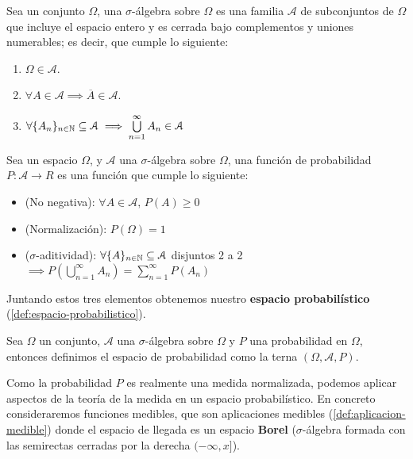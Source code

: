 \begin{definicion}
  Sea un conjunto $\Omega$, una $\sigma$-álgebra sobre $\Omega$ es una familia $\mathcal{A}$ de subconjuntos de $\Omega$ que incluye el espacio entero y es cerrada bajo complementos y uniones numerables; es decir, que cumple lo siguiente:
  \begin{enumerate}
    \item $\Omega \in \mathcal{A}$.
    \item $\forall A \in \mathcal{A} \implies \overline{A} \in \mathcal{A}$.
    \item $\forall \{A_n\}_{n \in \mathbb{N}} \subseteq \mathcal{A} \implies \bigcup \limits^\infty_{n = 1} A_n \in \mathcal{A}$
  \end{enumerate}
  \label{def:sigma-algebra}
\end{definicion}

\begin{definicion}
  Sea un espacio $\Omega$, y $\mathcal{A}$ una $\sigma$-álgebra sobre $\Omega$, una función de probabilidad $P : \mathcal{A} \to R$ es una función que cumple lo siguiente:

  \begin{itemize}
    \item (No negativa): $\forall A \in \mathcal{A}, \, P(A) \geq 0$
    \item (Normalización): $P(\Omega) = 1$
    \item ($\sigma$-aditividad): $\forall \{A\}_{n \in \mathbb{N}} \subseteq \mathcal{A}$ disjuntos 2 a 2 $\implies P \left(\bigcup \limits^\infty_{n = 1} A_n \right) = \sum \limits^\infty_{n = 1} P(A_n)$
  \end{itemize}
  \label{def:probabilidad}
\end{definicion}

Juntando estos tres elementos obtenemos nuestro \textbf{espacio probabilístico} (\autoref{def:espacio-probabilistico}).

\begin{definicion}
  Sea $\Omega$ un conjunto, $\mathcal{A}$ una $\sigma$-álgebra sobre $\Omega$ y $P$ una probabilidad en $\Omega$, entonces definimos el espacio de probabilidad como la terna $(\Omega, \mathcal{A}, P)$.
  \label{def:espacio-probabilistico}
\end{definicion}

Como la probabilidad $P$ es realmente una medida normalizada, podemos aplicar aspectos de la teoría de la medida en un espacio probabilístico. En concreto consideraremos funciones medibles, que son aplicaciones medibles (\autoref{def:aplicacion-medible}) donde el espacio de llegada es un espacio \textbf{Borel} ($\sigma$-álgebra formada con las semirectas cerradas por la derecha $(-\infty, x]$).

